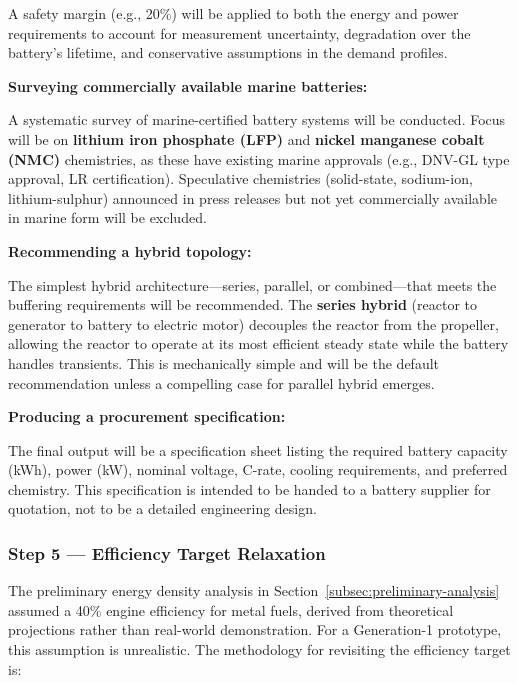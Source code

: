 \documentclass[12pt]{article}
\begin{document}
A safety margin (e.g., 20\%) will be applied to both the energy and power requirements to account for measurement uncertainty, degradation over the battery's lifetime, and conservative assumptions in the demand profiles.

\textbf{Surveying commercially available marine batteries:}

A systematic survey of marine-certified battery systems will be conducted. Focus will be on \textbf{lithium iron phosphate (LFP)} and \textbf{nickel manganese cobalt (NMC)} chemistries, as these have existing marine approvals (e.g., DNV-GL type approval, LR certification). Speculative chemistries (solid-state, sodium-ion, lithium-sulphur) announced in press releases but not yet commercially available in marine form will be excluded.

\textbf{Recommending a hybrid topology:}

The simplest hybrid architecture—series, parallel, or combined—that meets the buffering requirements will be recommended. The \textbf{series hybrid} (reactor to generator to battery to electric motor) decouples the reactor from the propeller, allowing the reactor to operate at its most efficient steady state while the battery handles transients. This is mechanically simple and will be the default recommendation unless a compelling case for parallel hybrid emerges.

\textbf{Producing a procurement specification:}

The final output will be a specification sheet listing the required battery capacity (kWh), power (kW), nominal voltage, C-rate, cooling requirements, and preferred chemistry. This specification is intended to be handed to a battery supplier for quotation, not to be a detailed engineering design.

\subsubsection*{Step 5 — Efficiency Target Relaxation}

The preliminary energy density analysis in Section~\ref{subsec:preliminary-analysis} assumed a 40\% engine efficiency for metal fuels, derived from theoretical projections rather than real-world demonstration. For a Generation-1 prototype, this assumption is unrealistic. The methodology for revisiting the efficiency target is:
\end{document}

